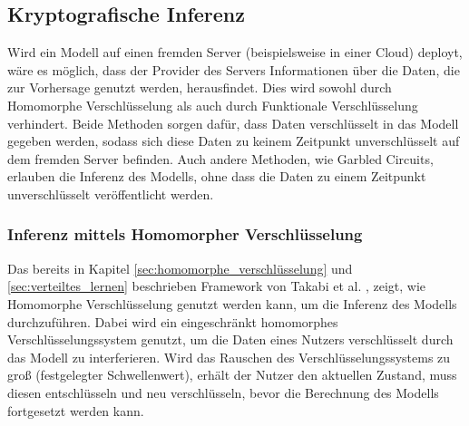 \subsection{Kryptografische Inferenz}\label{sec:krypto_inferenz}

Wird ein Modell auf einen fremden Server (beispielsweise in einer Cloud) deployt, wäre es möglich, dass der Provider des Servers Informationen über die Daten, die zur Vorhersage genutzt werden, herausfindet.
Dies wird sowohl durch Homomorphe Verschlüsselung als auch durch Funktionale Verschlüsselung verhindert.
Beide Methoden sorgen dafür, dass Daten verschlüsselt in das Modell gegeben werden, sodass sich diese Daten zu keinem Zeitpunkt unverschlüsselt auf dem fremden Server befinden.
Auch andere Methoden, wie Garbled Circuits, erlauben die Inferenz des Modells, ohne dass die Daten zu einem Zeitpunkt unverschlüsselt veröffentlicht werden.


\subsubsection*{Inferenz mittels Homomorpher Verschlüsselung}
Das bereits in Kapitel \ref{sec:homomorphe_verschlüsselung} und \ref{sec:verteiltes_lernen} beschrieben Framework von Takabi et al. \cite{P-104}, zeigt, wie Homomorphe Verschlüsselung genutzt werden kann, um die Inferenz des Modells durchzuführen.
Dabei wird ein eingeschränkt homomorphes Verschlüsselungssystem genutzt, um die Daten eines Nutzers verschlüsselt durch das Modell zu interferieren.
Wird das Rauschen des Verschlüsselungssystems zu groß (festgelegter Schwellenwert), erhält der Nutzer den aktuellen Zustand, muss diesen entschlüsseln und neu verschlüsseln, bevor die Berechnung des Modells fortgesetzt werden kann.

